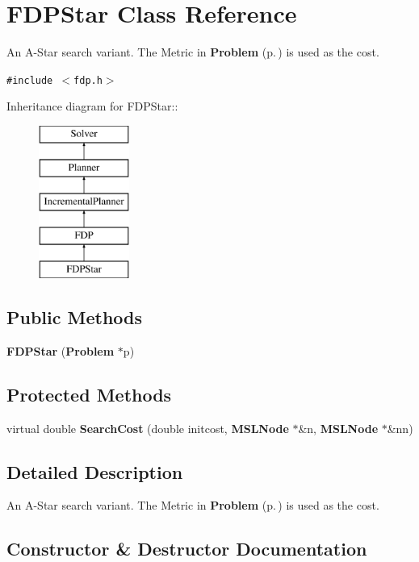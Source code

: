 \section{FDPStar  Class Reference}
\label{classFDPStar}
An A-Star search variant. The Metric in {\bf Problem} {\rm (p.\,\pageref{classProblem})} is used as the cost. 


{\tt \#include $<$fdp.h$>$}

Inheritance diagram for FDPStar::\begin{figure}[H]
\begin{center}
\leavevmode
\includegraphics[height=5cm]{classFDPStar}
\end{center}
\end{figure}
\subsection*{Public Methods}
\begin{CompactItemize}
\item 
{\bf FDPStar} ({\bf Problem} $\ast$p)
\end{CompactItemize}
\subsection*{Protected Methods}
\begin{CompactItemize}
\item 
virtual double {\bf Search\-Cost} (double initcost, {\bf MSLNode} $\ast$\&n, {\bf MSLNode} $\ast$\&nn)
\end{CompactItemize}


\subsection{Detailed Description}
An A-Star search variant. The Metric in {\bf Problem} {\rm (p.\,\pageref{classProblem})} is used as the cost.



\subsection{Constructor \& Destructor Documentation}
